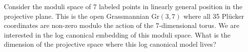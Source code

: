 Consider the moduli space of 7 labeled points in linearly general position in the projective plane. This is the open Grassmannian $\mathrm{Gr}(3,7)$ where all 35 Pl\"ucker coordinates are non-zero modulo the action of the 7-dimensional torus. We are interested in the log canonical embedding of this moduli space. What is the dimension of the projective space where this log canonical model lives?
